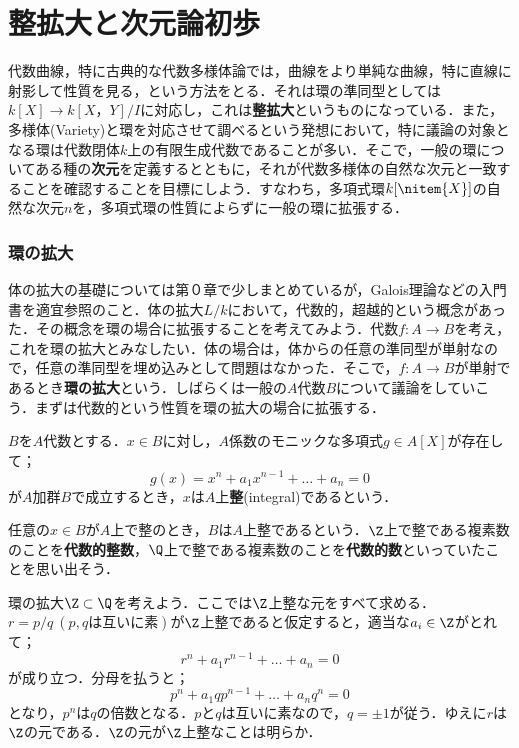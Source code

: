 \newpage
\part[Integral extension and The elements of dimension theory]{整拡大と次元論初歩}\label{part:整拡大と次元論初歩}

代数曲線，特に古典的な代数多様体論では，曲線をより単純な曲線，特に直線に射影して性質を見る，という方法をとる．それは環の準同型としては$k[X]\to k[X，Y]/I$に対応し，これは\textbf{整拡大}というものになっている．また，多様体(Variety)と環を対応させて調べるという発想において，特に議論の対象となる環は代数閉体$k$上の有限生成代数であることが多い．そこで，一般の環についてある種の\textbf{次元}を定義するとともに，それが代数多様体の自然な次元と一致することを確認することを目標にしよう．すなわち，多項式環$k[\nitem{X}]$の自然な次元$n$を，多項式環の性質によらずに一般の環に拡張する．

\section{環の拡大}

体の拡大の基礎については第０章で少しまとめているが，Galois理論などの入門書を適宜参照のこと．体の拡大$L/k$において，代数的，超越的という概念があった．その概念を環の場合に拡張することを考えてみよう．代数$f:A\to B$を考え，これを環の拡大とみなしたい．体の場合は，体からの任意の準同型が単射なので，任意の準同型を埋め込みとして問題はなかった．そこで，$f:A\to B$が単射であるとき\textbf{環の拡大}という．しばらくは一般の$A$代数$B$について議論をしていこう．まずは代数的という性質を環の拡大の場合に拡張する．

\begin{defi}[整]
	$B$を$A$代数とする．$x\in B$に対し，$A$係数のモニックな多項式$g\in A[X]$が存在して；
	\[g(x)=x^n+a_1x^{n-1}+\dots+a_n=0\]
	が$A$加群$B$で成立するとき，$x$は$A$上\textbf{整}(integral)であるという．
\end{defi}

任意の$x\in B$が$A$上で整のとき，$B$は$A$上整であるという．$\Z$上で整である複素数のことを\textbf{代数的整数}，$\Q$上で整である複素数のことを\textbf{代数的数}といっていたことを思い出そう．

\begin{ex}\label{ex:Q/Zの整閉包}
	環の拡大$\Z\subset\Q$を考えよう．ここでは$\Z$上整な元をすべて求める．$r=p/q ~(p,q\text{は互いに素})$が$\Z$上整であると仮定すると，適当な$a_i\in\Z$がとれて；
	\[r^n+a_1r^{n-1}+\dots+a_n=0\]
	が成り立つ．分母を払うと；
	\[p^n+a_1qp^{n-1}+\dots+a_nq^n=0\]
	となり，$p^n$は$q$の倍数となる．$p$と$q$は互いに素なので，$q=\pm 1$が従う．ゆえに$r$は$\Z$の元である．$\Z$の元が$\Z$上整なことは明らか．
\end{ex}

